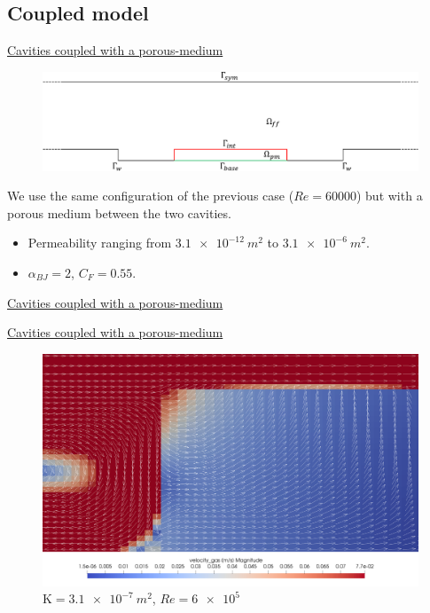 \documentclass{beamer}
\begin{document}
\subsection*{Coupled model}
\begin{frame}[label=coupled]{\hyperlink{coupledSupp}{Cavities coupled with a 
porous-medium}}
\begin{figure}
	\centering
	\includegraphics[width=\textwidth]{cavities_multidomain.pdf}
\end{figure}
We use the same configuration of the previous case ($Re=60000$) but with a 
porous medium between the two cavities.
\begin{itemize}
	\item Permeability ranging from $\SI{3.1e-12}{m^2}$ to $\SI{3.1e-6}{m^2}$.
	\item $\alpha_{BJ} = 2$, $C_F=0.55$.
\end{itemize}
\end{frame}
\begin{frame}{\hyperlink{coupledSupp}{Cavities coupled with a porous-medium}}
\begin{figure}
	\centering
	\hspace{-0.5cm}
	
\end{figure}
\end{frame}
\begin{frame}{\hyperlink{coupledSupp}{Cavities coupled with a porous-medium}}
\begin{figure}
	\centering
	\includegraphics[height=0.82\textheight]{coupled_first_cavity.png}
	\caption{\tiny $\mathrm{K}=\SI{3.1e-7}{m^2}$, $Re=\num{6e5}$}
\end{figure}
\end{frame}
\end{document}

